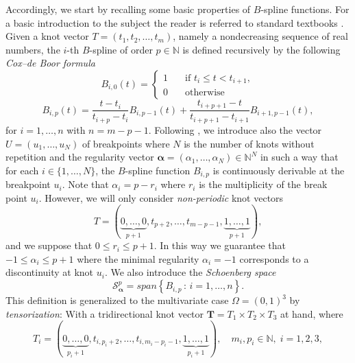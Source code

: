 Accordingly, we start by recalling some basic properties of $B$-spline functions. For a basic introduction to the subject the reader is referred to standard textbooks \cite{cohen2001geometric,farin1999nurbs,farin2002curves,gu2008computational,piegl1996nurbs,prautzsch2002bezier,rogers2001introduction,schumaker2007spline}. Given a knot vector $T=(t_1,t_2,\ldots,t_{m})$, namely a nondecreasing sequence of real numbers, the $i$-th $B$-spline of order $p \in \mathbb{N}$ is defined recursively  by the following {\em Cox–de Boor formula} 
\begin{equation*}
B_{i,0}(t) = 
\begin{cases}
1 \quad &\text{if } t_i \leq t < t_{i+1},\\
0 \quad &\text{otherwise}
\end{cases}
\end{equation*}
\begin{equation*}
B_{i,p}(t)=\frac{t - t_i}{t_{i+p}-t_i} B_{i,p-1}(t) + \frac{t_{i+p+1} - t}{t_{i+p+1}-t_{i+1}} B_{i+1,p-1}(t), 
\end{equation*}
for $i=1, \ldots, n$ with $n=m-p-1$. Following \cite{buffa2011isogeometric}, we introduce also the vector $U=(u_1,\ldots,u_N)$ of breakpoints where $N$ is the number of knots without repetition and the regularity vector $\bm{\alpha}=(\alpha_1, \ldots, \alpha_N) \in \mathbb{N}^N$ in such a way that for each $i \in \{ 1,\ldots,N\}$, the $B$-spline function $B_{i,p}$ is continuously derivable at the breakpoint $u_i$. Note that $\alpha_i=p-r_i$ where $r_i$ is the multiplicity of the break point $u_i$. However, we will only consider  {\em non-periodic} knot vectors
\begin{equation*}
T=(\underbrace{0,\ldots,0}_{p+1}, t_{p+2}, \ldots, t_{m-p-1}, \underbrace{1,\ldots,1}_{p+1}),
\end{equation*}  
and we suppose that $0 \leq r_i \leq p+1$. In this way we guarantee that $-1 \leq \alpha_i \leq p+1$ where the minimal regularity $\alpha_i=-1$ corresponds to a discontinuity at knot $u_i$. We also introduce the {\em Schoenberg space} 
\begin{equation*}
\mathcal{S}^p_{\bm{\alpha}}= span\left\{ B_{i,p} \,:\, i=1,\ldots,n\right\}.
\end{equation*} 
This definition is generalized to the multivariate case $\Omega=(0,1)^3$ by {\em tensorization}: With a tridirectional knot vector $\bm{T}=T_1 \times T_2 \times T_3$ at hand, where
\begin{equation*}
T_i=(\underbrace{0,\ldots,0}_{p_i+1}, t_{i,p_i+2}, \ldots, t_{i,m_i-p_i-1}, \underbrace{1,\ldots,1}_{p_i+1}),\quad m_i, p_i \in \mathbb{N}, \; i=1,2,3,
\end{equation*} 
